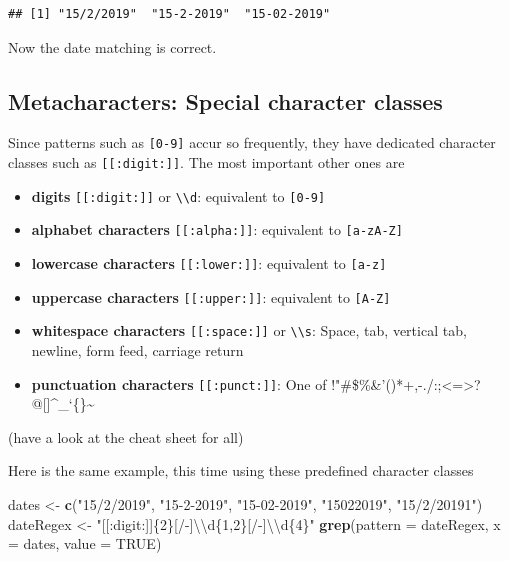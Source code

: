 \documentclass[]{book}
\newenvironment{Shaded}{\begin{snugshade}}{\end{snugshade}}
\newcommand{\CharTok}[1]{\textcolor[rgb]{0.31,0.60,0.02}{#1}}
\newcommand{\DataTypeTok}[1]{\textcolor[rgb]{0.13,0.29,0.53}{#1}}
\newcommand{\KeywordTok}[1]{\textcolor[rgb]{0.13,0.29,0.53}{\textbf{#1}}}
\newcommand{\NormalTok}[1]{#1}
\newcommand{\OtherTok}[1]{\textcolor[rgb]{0.56,0.35,0.01}{#1}}
\newcommand{\StringTok}[1]{\textcolor[rgb]{0.31,0.60,0.02}{#1}}
\providecommand{\tightlist}{%
  \setlength{\itemsep}{0pt}\setlength{\parskip}{0pt}}
\begin{document}
\begin{verbatim}
## [1] "15/2/2019"  "15-2-2019"  "15-02-2019"
\end{verbatim}

Now the date matching is correct.

\hypertarget{metacharacters-special-character-classes}{%
\subsection{Metacharacters: Special character classes}\label{metacharacters-special-character-classes}}

Since patterns such as \texttt{{[}0-9{]}} accur so frequently, they have dedicated character classes such as \texttt{{[}{[}:digit:{]}{]}}. The most important other ones are

\begin{itemize}
\tightlist
\item
  \textbf{digits} \texttt{{[}{[}:digit:{]}{]}} or \texttt{\textbackslash{}\textbackslash{}d}: equivalent to \texttt{{[}0-9{]}}
\item
  \textbf{alphabet characters} \texttt{{[}{[}:alpha:{]}{]}}: equivalent to \texttt{{[}a-zA-Z{]}}
\item
  \textbf{lowercase characters} \texttt{{[}{[}:lower:{]}{]}}: equivalent to \texttt{{[}a-z{]}}
\item
  \textbf{uppercase characters} \texttt{{[}{[}:upper:{]}{]}}: equivalent to \texttt{{[}A-Z{]}}
\item
  \textbf{whitespace characters} \texttt{{[}{[}:space:{]}{]}} or \texttt{\textbackslash{}\textbackslash{}s}: Space, tab, vertical tab, newline, form feed, carriage return
\item
  \textbf{punctuation characters} \texttt{{[}{[}:punct:{]}{]}}: One of !"\#\$\%\&'()*+,-./:;\textless{}=\textgreater{}?@{[}{]}\^{}\_`\{\textbar{}\}\textasciitilde{}
\end{itemize}

(have a look at the cheat sheet for all)

Here is the same example, this time using these predefined character classes

\begin{Shaded}
\begin{Highlighting}[]
\NormalTok{dates <-}\StringTok{ }\KeywordTok{c}\NormalTok{(}\StringTok{"15/2/2019"}\NormalTok{, }\StringTok{"15-2-2019"}\NormalTok{, }\StringTok{"15-02-2019"}\NormalTok{, }\StringTok{"15022019"}\NormalTok{, }\StringTok{"15/2/20191"}\NormalTok{)}
\NormalTok{dateRegex <-}\StringTok{ "[[:digit:]]\{2\}[/-]}\CharTok{\textbackslash{}\textbackslash{}}\StringTok{d\{1,2\}[/-]}\CharTok{\textbackslash{}\textbackslash{}}\StringTok{d\{4\}"}
\KeywordTok{grep}\NormalTok{(}\DataTypeTok{pattern =}\NormalTok{ dateRegex, }\DataTypeTok{x =}\NormalTok{ dates, }\DataTypeTok{value =} \OtherTok{TRUE}\NormalTok{)}
\end{Highlighting}
\end{Shaded}
\end{document}
